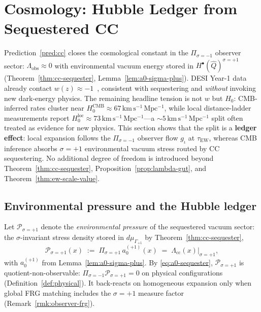 \section{Cosmology: Hubble Ledger from Sequestered CC}
\label{sec:cosmology}

Prediction~\ref{pred:cc} closes the cosmological constant in the
$\Pi_{\sigma=-1}$ observer sector:
$\Lambda_{\mathrm{obs}}\approx 0$ with environmental vacuum energy stored in
$H^\bullet(\hat Q)^{\sigma=+1}$ (Theorem~\ref{thm:cc-sequester},
Lemma~\ref{lem:a0-sigma-plus}). DESI Year-1 data already contact
$w(z)\approx -1$~\cite{DESI2024}, consistent with sequestering and
\emph{without} invoking new dark-energy physics. The remaining headline tension
is not $w$ but $H_0$: CMB-inferred rates cluster near
$H_0^{\mathrm{CMB}}\approx 67\,\mathrm{km\,s^{-1}\,Mpc^{-1}}$, while local
distance-ladder measurements report
$H_0^{\mathrm{loc}}\approx 73\,\mathrm{km\,s^{-1}\,Mpc^{-1}}$---a
$\sim 5\,\mathrm{km\,s^{-1}\,Mpc^{-1}}$ split often treated as evidence for
new physics. This section shows that the split is a \textbf{ledger effect}:
local expansion follows the $\Pi_{\sigma=-1}$ observer flow $g_\iota$ at
$\tau_{\mathrm{EW}}$, whereas CMB inference absorbs $\sigma=+1$ environmental
vacuum stress routed by CC sequestering. No additional degree of freedom is
introduced beyond Theorem~\ref{thm:cc-sequester},
Proposition~\ref{prop:lambda-gut}, and Theorem~\ref{thm:ew-scale-value}.

\subsection{Environmental pressure and the Hubble ledger}
\label{sec:cosmology:ledger}

\begin{definition}
\label{def:env-pressure}
Let $\mathcal{P}_{\sigma=+1}$ denote the \emph{environmental pressure} of the
sequestered vacuum sector: the $\sigma$-invariant stress density stored in
$d\mu_{\Gamma_{+1}}$ by Theorem~\ref{thm:cc-sequester},
\begin{equation}\label{eq:env-pressure}
  \mathcal{P}_{\sigma=+1}(x)
  \;:=\;
  \Pi_{\sigma=+1}\,a_0^{(+1)}(x)
  \;=\;
  \Lambda_{\mathrm{cc}}(x)\big|_{\sigma=+1},
\end{equation}
with $a_0^{(+1)}$ from Lemma~\ref{lem:a0-sigma-plus}. By
\eqref{eq:a0-sequester}, $\mathcal{P}_{\sigma=+1}$ is
quotient-non-observable: $\Pi_{\sigma=-1}\mathcal{P}_{\sigma=+1}=0$ on
physical configurations (Definition~\ref{def:physical}). It back-reacts on
homogeneous expansion only when global FRG matching includes the
$\sigma=+1$ measure factor (Remark~\ref{rmk:observer-frg}).
\end{definition}

